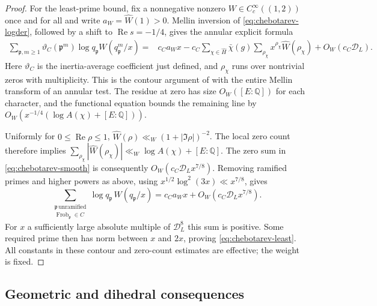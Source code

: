 \documentclass[11pt,a4paper]{article}
\numberwithin{equation}{section}
\theoremstyle{definition}
\theoremstyle{remark}
\newcommand{\QQ}{\mathbb Q}
\newcommand{\Rea}{\operatorname{Re}}
\begin{document}
\begin{proof}
For the least-prime bound, fix a nonnegative nonzero
$W\in C_c^\infty((1,2))$ once and for all and write
$a_W=\widehat W(1)>0$.
Mellin inversion of \eqref{eq:chebotarev-logder}, followed by a shift
to $\Rea s=-1/4$, gives the annular explicit formula
\begin{align}\label{eq:chebotarev-smooth}
 \sum_{\mathfrak p,m\ge1}
   \vartheta_C(\mathfrak p^m)\log q_{\mathfrak p}
          W(q_{\mathfrak p}^m/x)
 ={}&c_Ca_Wx
  -c_C\sum_{\chi\in\widehat H}\bar\chi(g)
       \sum_{\rho_\chi}x^{\rho_\chi}\widehat W(\rho_\chi)
  +O_W(c_C\mathcal D_L).
\end{align}
Here $\vartheta_C$ is the inertia-average coefficient just defined,
and $\rho_\chi$ runs over nontrivial zeros with multiplicity.
This is the contour argument of \cite[Proposition~6]{DKN} with the
entire Mellin transform of an annular test. The residue at zero has
size $O_W([E:\QQ])$ for each character, and the functional equation
bounds the remaining line by
$O_W(x^{-1/4}(\log A(\chi)+[E:\QQ]))$.

Uniformly for $0\le\Rea\rho\le1$,
$\widehat W(\rho)\ll_W(1+|\Im\rho|)^{-2}$.
The local zero count therefore implies
$\sum_{\rho_\chi}|\widehat W(\rho_\chi)|
\ll_W\log A(\chi)+[E:\QQ]$.
The zero sum in \eqref{eq:chebotarev-smooth} is consequently
$O_W(c_C\mathcal D_Lx^{7/8})$.
Removing ramified primes and higher powers as above, using
$x^{1/2}\log^2(3x)\ll x^{7/8}$, gives
\[
 \sum_{\substack{\mathfrak p\,\mathrm{unramified}\\
                  \operatorname{Frob}_{\mathfrak p}\in C}}
 \log q_{\mathfrak p}\,W(q_{\mathfrak p}/x)
  =c_Ca_Wx+O_W(c_C\mathcal D_Lx^{7/8}).
\]
For $x$ a sufficiently large absolute multiple of $\mathcal D_L^8$
this sum is positive. Some required prime then has norm between $x$
and $2x$, proving \eqref{eq:chebotarev-least}. All constants in these
contour and zero-count estimates are effective; the weight is fixed.
\end{proof}

\subsection{Geometric and dihedral consequences}\label{subsec:potentially-abelian}
\end{document}
